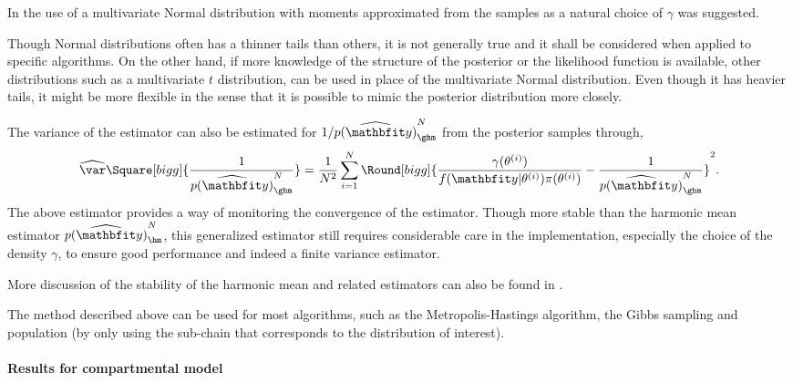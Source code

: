 In \cite{Gelfand:1994ux} the use of a multivariate Normal distribution with moments approximated from the samples as a natural choice of $\gamma$ was suggested.
\begin{draftpar}
Though Normal distributions often has a thinner tails than others, it is not generally true and it shall be considered when applied to specific algorithms. On the other hand, if more knowledge of the structure of the posterior or the likelihood function is available, other distributions such as a multivariate $t$ distribution, can be used in place of the multivariate Normal distribution. Even though it has heavier tails, it might be more flexible in the sense that it is possible to mimic the posterior distribution more closely.
\end{draftpar}

The variance of the estimator can also be estimated for $1/\widehat{p(\data)}_{\ghm}^N$ from the posterior samples through,
\begin{equation}
  \widehat{\var}\Square[bigg]{\frac{1}{\widehat{p(\data)}_{\ghm}^N}} =
  \frac{1}{N^2}\sum_{i=1}^N \Round[bigg]{
    \frac{\gamma(\theta^{(i)})}{f(\data|\theta^{(i)})\pi(\theta^{(i)})}
    - \frac{1}{\widehat{p(\data)}_{\ghm}^N}}^2.
\end{equation}
The above estimator provides a way of monitoring the convergence of the estimator. Though more stable than the harmonic mean estimator $\widehat{p(\data)}_{\hm}^N$, this generalized estimator still requires considerable care in the implementation, especially the choice of the density $\gamma$, to ensure good performance and indeed a finite variance estimator.
\begin{draftpar}
More discussion of the stability of the harmonic mean and related estimators can also be found in \cite{Raftery:2007ud}.
\end{draftpar}

The method described above can be used for most \mcmc algorithms, such as the Metropolis-Hastings algorithm, the Gibbs sampling and population \mcmc (by only using the sub-chain that corresponds to the distribution of interest).

\paragraph{Results for \pet compartmental model}

